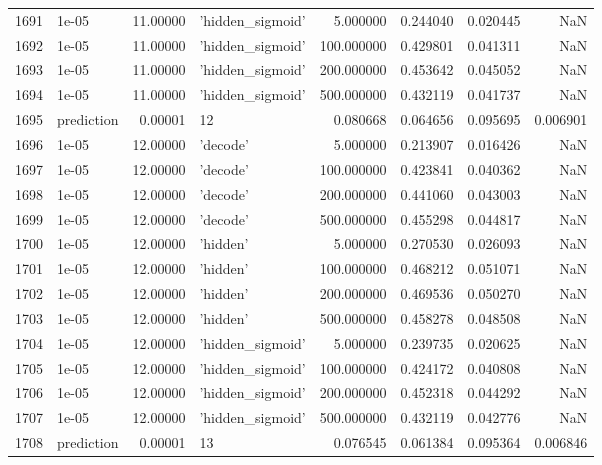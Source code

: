 \documentclass[10pt,a4paper]{article}
\begin{document}
\begin{tabular}{llrlrrrr}
1691 &       1e-05 &  11.00000 &   'hidden\_sigmoid' &    5.000000 &  0.244040 &  0.020445 &       NaN \\
1692 &       1e-05 &  11.00000 &   'hidden\_sigmoid' &  100.000000 &  0.429801 &  0.041311 &       NaN \\
1693 &       1e-05 &  11.00000 &   'hidden\_sigmoid' &  200.000000 &  0.453642 &  0.045052 &       NaN \\
1694 &       1e-05 &  11.00000 &   'hidden\_sigmoid' &  500.000000 &  0.432119 &  0.041737 &       NaN \\
1695 &  prediction &   0.00001 &                 12 &    0.080668 &  0.064656 &  0.095695 &  0.006901 \\
1696 &       1e-05 &  12.00000 &           'decode' &    5.000000 &  0.213907 &  0.016426 &       NaN \\
1697 &       1e-05 &  12.00000 &           'decode' &  100.000000 &  0.423841 &  0.040362 &       NaN \\
1698 &       1e-05 &  12.00000 &           'decode' &  200.000000 &  0.441060 &  0.043003 &       NaN \\
1699 &       1e-05 &  12.00000 &           'decode' &  500.000000 &  0.455298 &  0.044817 &       NaN \\
1700 &       1e-05 &  12.00000 &           'hidden' &    5.000000 &  0.270530 &  0.026093 &       NaN \\
1701 &       1e-05 &  12.00000 &           'hidden' &  100.000000 &  0.468212 &  0.051071 &       NaN \\
1702 &       1e-05 &  12.00000 &           'hidden' &  200.000000 &  0.469536 &  0.050270 &       NaN \\
1703 &       1e-05 &  12.00000 &           'hidden' &  500.000000 &  0.458278 &  0.048508 &       NaN \\
1704 &       1e-05 &  12.00000 &   'hidden\_sigmoid' &    5.000000 &  0.239735 &  0.020625 &       NaN \\
1705 &       1e-05 &  12.00000 &   'hidden\_sigmoid' &  100.000000 &  0.424172 &  0.040808 &       NaN \\
1706 &       1e-05 &  12.00000 &   'hidden\_sigmoid' &  200.000000 &  0.452318 &  0.044292 &       NaN \\
1707 &       1e-05 &  12.00000 &   'hidden\_sigmoid' &  500.000000 &  0.432119 &  0.042776 &       NaN \\
1708 &  prediction &   0.00001 &                 13 &    0.076545 &  0.061384 &  0.095364 &  0.006846 \\

\end{tabular}
\end{document}
